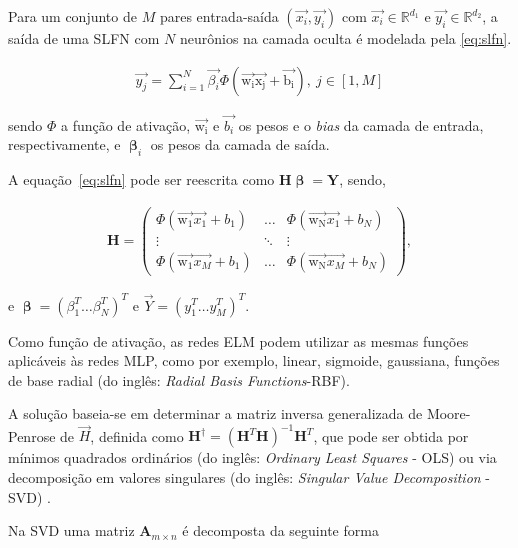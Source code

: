 Para um conjunto de $M$ pares entrada-saída $(\vec{x_i}, \vec{y_i})$ com $\vec{x_i} \in \mathbb{R}^{d_1}$ e $\vec{y_i} \in \mathbb{R}^{d_2}$, a saída de uma SLFN com $N$ neurônios na camada oculta é modelada pela \autoref{eq:slfn}.

\begin{eqnarray}
\vec{y_j} = \sum_{i=1}^{N} \vec{\beta_i} \Phi \mathrm{(\vec{w_i}\vec{x_j} + \vec{b_i})}, \: j \in [1,M]\label{eq:slfn}
\end{eqnarray}

\noindent sendo $\Phi$ a função de ativação, $\mathrm{\vec{w_i}}$ e $\vec{b_i}$ os pesos e o \emph{bias} da camada de entrada, respectivamente, e $\boldsymbol{\upbeta}_i$ os pesos da camada de saída.

A equação~\ref{eq:slfn} pode ser reescrita como $\mathbf{H}\boldsymbol{\upbeta} = \mathbf{Y}$, sendo,
\begin{small}
	\begin{eqnarray}
	\mathbf{H} =
	\left( \begin{array}{ccc}
	\Phi(\mathrm{\vec{w_1}}\vec{x_1} + b_1) & \ldots & \Phi(\mathrm{\vec{w_N}}\vec{x_1} + b_N) \\
	\vdots      & \ddots & \vdots \\
	\Phi(\mathrm{\vec{w_1}}\vec{x_M} + b_1) & \ldots & \Phi(\mathrm{\vec{w_N}}\vec{x_M} + b_N)
	\end{array} \right), \label{eq:slfn_mat}
	\end{eqnarray}
\end{small}
e $\boldsymbol{\upbeta} = (\beta^T_1 \ldots \beta^T_N)^T$ e $\vec{Y} = (y^T_1 \ldots y^T_M)^T$.

Como função de ativação, as redes ELM podem utilizar as mesmas funções aplicáveis às redes MLP, como por exemplo, linear, sigmoide, gaussiana, funções de base radial (do inglês: \textit{Radial Basis Functions}-RBF).

A solução baseia-se em determinar a matriz inversa generalizada de Moore-Penrose de $\vec{H}$, definida como $\mathbf{H}^\dagger = (\mathbf{H}^T\mathbf{H})^{-1}\mathbf{H}^T$, que pode ser obtida por mínimos quadrados ordinários (do inglês: \textit{Ordinary Least Squares} - OLS) ou via decomposição em valores singulares (do inglês: \textit{Singular Value Decomposition} - SVD) \cite{tcc:souto2000, tcc:coliboro2008}.  

Na SVD uma matriz $\mathbf{A}_{m\times n}$ é decomposta da seguinte forma \cite{tcc:souto2000}

